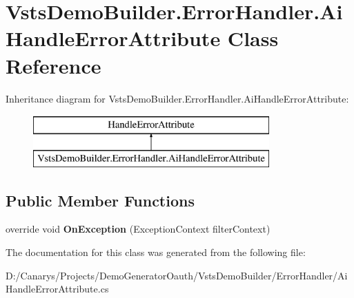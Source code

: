 \hypertarget{class_vsts_demo_builder_1_1_error_handler_1_1_ai_handle_error_attribute}{}\section{Vsts\+Demo\+Builder.\+Error\+Handler.\+Ai\+Handle\+Error\+Attribute Class Reference}
\label{class_vsts_demo_builder_1_1_error_handler_1_1_ai_handle_error_attribute}
Inheritance diagram for Vsts\+Demo\+Builder.\+Error\+Handler.\+Ai\+Handle\+Error\+Attribute\+:\begin{figure}[H]
\begin{center}
\leavevmode
\includegraphics[height=2.000000cm]{class_vsts_demo_builder_1_1_error_handler_1_1_ai_handle_error_attribute}
\end{center}
\end{figure}
\subsection*{Public Member Functions}
\begin{DoxyCompactItemize}
\item 
\mbox{\label{class_vsts_demo_builder_1_1_error_handler_1_1_ai_handle_error_attribute_a9fbe20a7f02cbe252d91e4e4f4308771}} 
override void {\bfseries On\+Exception} (Exception\+Context filter\+Context)
\end{DoxyCompactItemize}


The documentation for this class was generated from the following file\+:\begin{DoxyCompactItemize}
\item 
D\+:/\+Canarys/\+Projects/\+Demo\+Generator\+Oauth/\+Vsts\+Demo\+Builder/\+Error\+Handler/Ai\+Handle\+Error\+Attribute.\+cs\end{DoxyCompactItemize}
